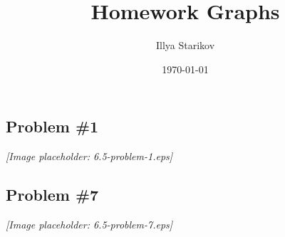 \documentclass[12pt]{article}
\title{Homework Graphs}
\date{\today}
\author{Illya Starikov}
\begin{document}
\maketitle

\setcounter{section}{6}
\setcounter{subsection}{5}
\subsection{Problem \#1}
\begin{center}
    \textit{[Image placeholder: 6.5-problem-1.eps]}
\end{center}

\setcounter{section}{6}
\setcounter{subsection}{5}
\subsection{Problem \#7}
\begin{center}
    \textit{[Image placeholder: 6.5-problem-7.eps]}
\end{center}
\end{document}
